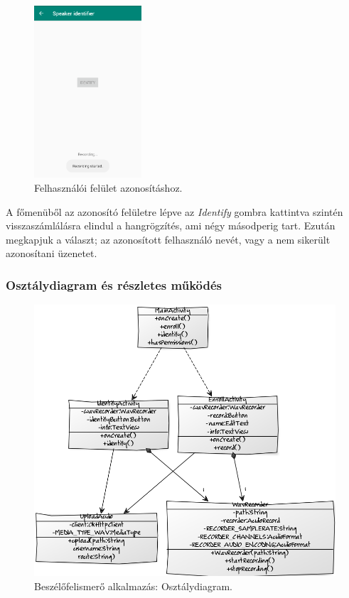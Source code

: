 \begin{figure}[!ht]
	\centering
	\includegraphics[width=40mm, keepaspectratio]{figures/app-identify-screen-1.png}
	\caption{Felhasználói felület azonosításhoz.}
	\label{fig:app-identify-screen-1}
\end{figure}

\newpage
A főmenüből az azonosító felületre lépve az \emph{Identify} gombra kattintva szintén visszaszámlálásra elindul a hangrögzítés, ami négy másodperig tart. Ezután megkapjuk a választ; az azonosított felhasználó nevét, vagy a nem sikerült azonosítani üzenetet.

\subsubsection{Osztálydiagram és részletes működés}

\begin{figure}[!ht]
	\centering
	\includegraphics[width=130mm, keepaspectratio]{figures/app-class-diag.png}
	\caption{Beszélőfelismerő alkalmazás: Osztálydiagram.}
	\label{fig:app-class-diag}
\end{figure}

